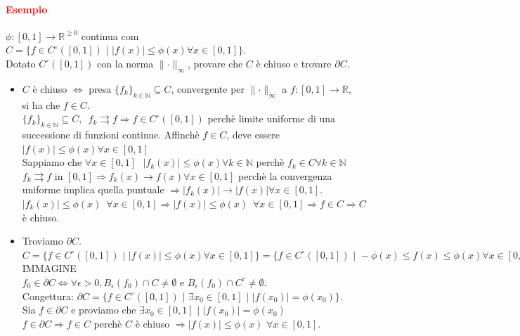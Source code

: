 \documentclass{article}
\newcommand{\R}{\mathbb{R}}
\newcommand{\N}{\mathbb{N}}
\begin{document}
\paragraph{\textcolor{red}{Esempio}}
$\phi: [0,1]\rightarrow \R^{\geq 0}$ continua com $C=\{ f \in C^\circ ([0,1]) \,\,|\,\,|f(x)|\leq \phi(x) \forall x \in [0,1]\}$.\\
Dotato $C^\circ([0,1])$ con la norma $\parallel\cdot \parallel_\infty$, provare che $C$ è chiuso e trovare $\partial C$.
\begin{itemize}
    \item $C$ è chiuso $\Leftrightarrow$ presa $\{f_k\}_{k \in \N} \subseteq C$, convergente per $\parallel \cdot \parallel_\infty$ a $f:[0,1]\rightarrow \R$, si ha che $f \in C$.\\
    $\{f_k\}_{k\in\N} \subseteq C,\,\,\, f_k \rightrightarrows f \Rightarrow f \in C^\circ([0,1])$ perchè limite uniforme di una successione di funzioni continue. Affinchè $f \in C$, deve essere $|f(x)|\leq \phi(x) \forall x \in [0,1]$\\
    Sappiamo che $\forall x \in [0,1]\,\,\,\, |f_k(x)|\leq \phi(x) \forall k \in \N$ perchè $f_k \in C \forall k \in \N$\\
    $f_k \rightrightarrows f$ in $[0,1]\Rightarrow f_k(x) \rightarrow f(x) \forall x \in [0,1] $ perchè la convergenza uniforme implica quella puntuale $\Rightarrow |f_k(x)|\rightarrow|f(x)|\forall x \in [0,1]$.\\
    $|f_k(x)|\leq \phi(x) \,\,\, \forall x \in [0,1] \Rightarrow |f(x)|\leq \phi(x) \,\,\, \forall x \in [0,1] \Rightarrow f \in C \Rightarrow C$ è chiuso.
    \item Troviamo $\partial C$.\\
    $C=\{ f \in C^\circ ([0,1])\,\, |\,\,|f(x)|\leq \phi(x) \forall x \in [0,1]\}=\{f \in C^\circ ([0,1])\,\, |\,\, -\phi(x) \leq f(x) \leq \phi(x) \forall x \in [0,1] \}$\\
    IMMAGINE\\
    $f_0\in \partial C \Leftrightarrow \forall \epsilon > 0, B_\epsilon(f_0)\cap C \neq \emptyset$ e $B_\epsilon (f_0)\cap C^c \neq \emptyset$.\\
    Congettura: $\partial C =\{f\in C^\circ([0,1])\,\, |\,\, \exists x_0\in [0,1]\,\,|\,\, |f(x_0)|=\phi(x_0) \}$.\\
    Sia $f\in \partial C$ e proviamo che $\exists x_0 \in [0,1]\,\, |\,\, |f(x_0)|=\phi(x_0)$\\
    $f \in \partial C \Rightarrow f \in C$ perchè $C$ è chiuso $\Rightarrow |f(x)|\leq \phi(x) \,\, \forall x \in [0,1]$.\\

\end{itemize}
\end{document}
